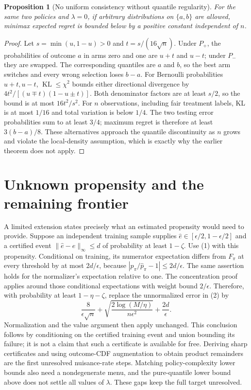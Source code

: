 \documentclass[11pt]{article}
\newtheorem{proposition}[theorem]{Proposition}
\theoremstyle{remark}
\newcommand{\KL}{\operatorname{KL}}
\begin{document}
\begin{proposition}[No uniform consistency without quantile regularity]
For the same two policies and $\lambda=0$, if arbitrary distributions on
$\{a,b\}$ are allowed, minimax expected regret is bounded below by a
positive constant independent of $n$.
\end{proposition}
\begin{proof}
Let $s=\min(u,1-u)>0$ and $t=s/(16\sqrt n)$. Under $P_+$, the
probabilities of outcome $a$ in arms zero and one are $u+t$ and $u-t$;
under $P_-$ they are swapped. The corresponding quantiles are $a$ and
$b$, so the best arm switches and every wrong selection loses $b-a$.
For Bernoulli probabilities $u+t,u-t$, $\KL\leq\chi^2$ bounds either
directional divergence by $4t^2/[(u\mp t)(1-u\pm t)]$.
Both denominator factors are at least $s/2$, so the bound is at most
$16t^2/s^2$. For $n$ observations, including fair treatment labels,
KL is at most $1/16$ and total variation is below $1/4$.
The two testing error probabilities sum to at least $3/4$; maximum
regret is therefore at least $3(b-a)/8$. These alternatives approach
the quantile discontinuity as $n$ grows and violate the local-density
assumption, which is exactly why the earlier theorem does not apply.
\end{proof}

\section{Unknown propensity and the remaining frontier}
A limited extension states precisely what an estimated propensity would
need to provide. Suppose an independent training sample supplies
$\widehat e\in[\epsilon/2,1-\epsilon/2]$ and a certified event
$\|\widehat e-e\|_\infty\leq d$ of probability at least $1-\zeta$.
Use (1) with this propensity. Conditional on training, its numerator
expectation differs from $F_\pi$ at every threshold by at most
$2d/\epsilon$, because $|p_\pi/\widehat p_\pi-1|\leq2d/\epsilon$.
The same assertion holds for the normalizer's expectation relative to one.
The concentration proof applies around those conditional expectations
with weight bound $2/\epsilon$. Therefore, with probability at least
$1-\eta-\zeta$, replace the unnormalized error in (2) by
\[
 \frac8{\epsilon\sqrt n}
 +\sqrt{\frac{2\log(M/\eta)}{n\epsilon^2}}
 +\frac{2d}{\epsilon}.
\]
Normalization and the value argument then apply unchanged. This conclusion
follows by conditioning on the certified training event and union bounding
its failure; it is not a claim that such a certificate is available for
free. Deriving sharp certificates and using outcome-CDF augmentation to
obtain product remainders are the first unresolved nuisance-rate steps.
Matching policy-complexity lower bounds also need a nondegenerate menu,
and the pure-quantile lower bound above does not settle all values of
$\lambda$. These gaps keep the full target unresolved.
\end{document}
